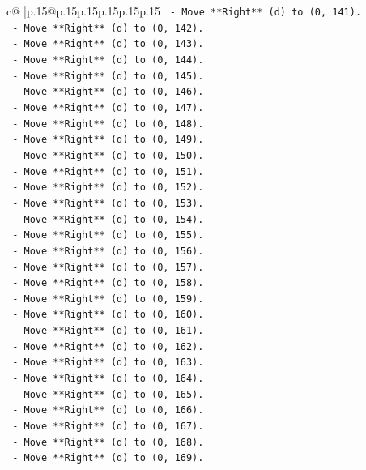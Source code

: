 \documentclass{article}
\begin{document}
{\begin{supertabular}{c@{$\;$}|p{.15\linewidth}@{}p{.15\linewidth}p{.15\linewidth}p{.15\linewidth}p{.15\linewidth}p{.15\linewidth}}
{{{\texttt{    {-} Move **Right** (d) to (0, 141).} \\
\texttt{    {-} Move **Right** (d) to (0, 142).} \\
\texttt{    {-} Move **Right** (d) to (0, 143).} \\
\texttt{    {-} Move **Right** (d) to (0, 144).} \\
\texttt{    {-} Move **Right** (d) to (0, 145).} \\
\texttt{    {-} Move **Right** (d) to (0, 146).} \\
\texttt{    {-} Move **Right** (d) to (0, 147).} \\
\texttt{    {-} Move **Right** (d) to (0, 148).} \\
\texttt{    {-} Move **Right** (d) to (0, 149).} \\
\texttt{    {-} Move **Right** (d) to (0, 150).} \\
\texttt{    {-} Move **Right** (d) to (0, 151).} \\
\texttt{    {-} Move **Right** (d) to (0, 152).} \\
\texttt{    {-} Move **Right** (d) to (0, 153).} \\
\texttt{    {-} Move **Right** (d) to (0, 154).} \\
\texttt{    {-} Move **Right** (d) to (0, 155).} \\
\texttt{    {-} Move **Right** (d) to (0, 156).} \\
\texttt{    {-} Move **Right** (d) to (0, 157).} \\
\texttt{    {-} Move **Right** (d) to (0, 158).} \\
\texttt{    {-} Move **Right** (d) to (0, 159).} \\
\texttt{    {-} Move **Right** (d) to (0, 160).} \\
\texttt{    {-} Move **Right** (d) to (0, 161).} \\
\texttt{    {-} Move **Right** (d) to (0, 162).} \\
\texttt{    {-} Move **Right** (d) to (0, 163).} \\
\texttt{    {-} Move **Right** (d) to (0, 164).} \\
\texttt{    {-} Move **Right** (d) to (0, 165).} \\
\texttt{    {-} Move **Right** (d) to (0, 166).} \\
\texttt{    {-} Move **Right** (d) to (0, 167).} \\
\texttt{    {-} Move **Right** (d) to (0, 168).} \\
\texttt{    {-} Move **Right** (d) to (0, 169).} \\
}}}
\end{supertabular}}
\end{document}
